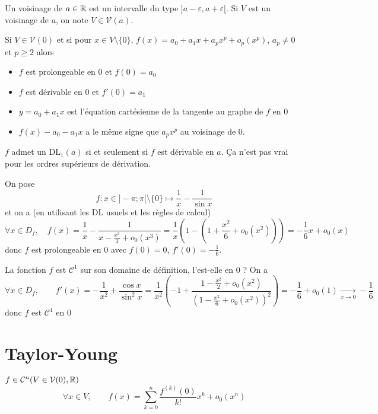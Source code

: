 \begin{dfn}
    Un voisinage de $a\in\mathbb R$ est un intervalle du type $]a-\varepsilon, a+\varepsilon[$. Si $V$ est un voisinage de $a$, on note $V\in\mathcal V(a)$.
\end{dfn}

Si $V\in\mathcal V(0)$ et si pour $x\in V\setminus\{0\}$, $f(x)=a_0+a_1x +a_px^p+o_p(x^p)$, $a_p\neq 0$ et $p\geq 2$ alors \begin{itemize}
    \item $f$ est prolongeable en $0$ et $f(0)=a_0$
    \item $f$ est dérivable en $0$ et $f'(0)=a_1$
    \item $y=a_0+a_1x$ est l'équation cartésienne de la tangente au graphe de $f$ en $0$
    \item $f(x)-a_0-a_1x$ a le même signe que $a_px^p$ au voisinage de $0$.
\end{itemize}

\begin{rem}
    $f$ admet un $\mathrm{DL}_1(a)$ si et seulement si $f$ est dérivable en $a$. Ça n'est pas vrai pour les ordres supérieurs de dérivation.
\end{rem}

\begin{ex}
    On pose \[
        f: x\in]-\pi;\pi[\setminus\{0\} \longmapsto \frac 1x-\frac1{\sin x}
    \]
    et on a (en utilisant les DL usuels et les règles de calcul) \[
        \forall x\in D_f,\quad f(x)=\frac1x-\frac1{x-\frac{x^3}3+o_0(x^3)}=\frac1x \left( 1- \left( 1+\frac {x^2}6+o_0(x^2) \right)\right)=-\frac16x+o_0(x)
    \]
    donc $f$ est prolongeable en $0$ avec $f(0)=0$, $f'(0)=-\frac 16$.

    La fonction $f$ est $\mathcal C^1$ sur son domaine de définition, l'est-elle en $0$ ? On a \[
        \forall x\in D_f, \qquad f'(x)=-\frac1{x^2}+\frac{\cos x}{\sin^2x}=\frac1{x^2} \left( -1+\frac{1-\frac{x^2}2+o_0(x^2)}{(1-\frac{x^2}6+o_0(x^2))^2} \right)=-\frac16+o_0(1)\xrightarrow[x\to 0]{}-\frac16
    \]
    donc $f$ est $\mathcal C^1$ en $0$
\end{ex}

\section{Taylor-Young}

\begin{thm}
    \Hyp $f\in\mathcal C^n(V\in\mathcal V(0), \mathbb R)$
    \Conc \[
            \forall x\in V, \qquad f(x)=\sum_{k=0}^n\frac{f^{(k)}(0)}{k!}x^k+o_0(x^n)
    \]
\end{thm}

